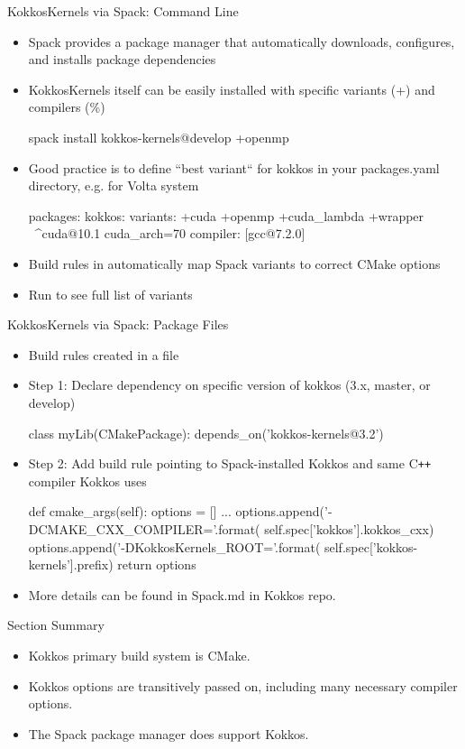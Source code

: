 \begin{frame}[fragile]{KokkosKernels via Spack: Command Line}
\begin{itemize}
\item Spack provides a package manager that automatically downloads, configures, and installs package dependencies
\item KokkosKernels itself can be easily installed with specific variants (+) and compilers (\%)
\begin{shell}
spack install kokkos-kernels@develop +openmp %
\end{shell}
\item Good practice is to define ``best variant`` for kokkos in your packages.yaml directory, e.g. for Volta system
\begin{shell}
packages:
   kokkos:
    variants: +cuda +openmp +cuda_lambda +wrapper \
              ^cuda@10.1 cuda_arch=70
    compiler: [gcc@7.2.0]
\end{shell}
\item Build rules in  automatically map Spack variants to correct CMake options
\item Run \inlineshell{spack info kokkos-kernels} to see full list of variants
\end{itemize}
\end{frame}

\begin{frame}[fragile]{KokkosKernels via Spack: Package Files}
\begin{itemize}
\item Build rules created in a  file
\item Step 1: Declare dependency on specific version of kokkos (3.x, master, or develop)
\begin{shell}
class myLib(CMakePackage):
  depends_on('kokkos-kernels@3.2')
\end{shell}
\item Step 2: Add build rule pointing to Spack-installed Kokkos and same C\texttt{++} compiler Kokkos uses
\begin{shell}
def cmake_args(self):
  options = []
  ...
  options.append('-DCMAKE_CXX_COMPILER={}'.format(
     self.spec['kokkos'].kokkos_cxx)
  options.append('-DKokkosKernels_ROOT={}'.format(
     self.spec['kokkos-kernels'].prefix)
  return options
\end{shell}
\item More details can be found in Spack.md in Kokkos repo.
\end{itemize}
\end{frame}

\begin{frame}{Section Summary}

  \begin{itemize}
    \item{Kokkos primary build system is CMake.}
    \item{Kokkos options are transitively passed on, including many necessary compiler options.}
    \item{The Spack package manager does support Kokkos.}
  \end{itemize}

\end{frame}
